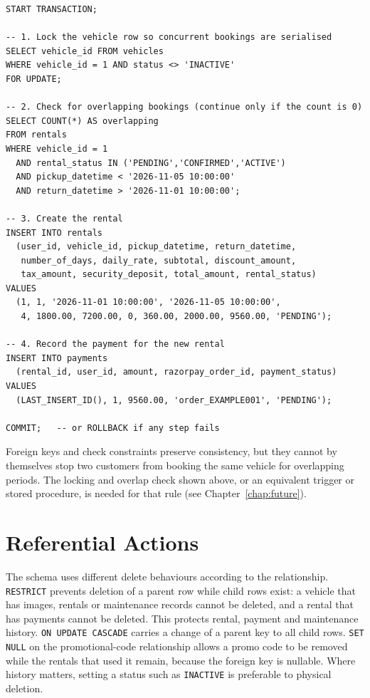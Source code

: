 \documentclass[10pt,a4paper]{report}
\newcommand{\col}[1]{\texttt{#1}}
\begin{document}
\begin{lstlisting}[caption={Booking transaction for a rental and its payment},label={lst:txn}]
START TRANSACTION;

-- 1. Lock the vehicle row so concurrent bookings are serialised
SELECT vehicle_id FROM vehicles
WHERE vehicle_id = 1 AND status <> 'INACTIVE'
FOR UPDATE;

-- 2. Check for overlapping bookings (continue only if the count is 0)
SELECT COUNT(*) AS overlapping
FROM rentals
WHERE vehicle_id = 1
  AND rental_status IN ('PENDING','CONFIRMED','ACTIVE')
  AND pickup_datetime < '2026-11-05 10:00:00'
  AND return_datetime > '2026-11-01 10:00:00';

-- 3. Create the rental
INSERT INTO rentals
  (user_id, vehicle_id, pickup_datetime, return_datetime,
   number_of_days, daily_rate, subtotal, discount_amount,
   tax_amount, security_deposit, total_amount, rental_status)
VALUES
  (1, 1, '2026-11-01 10:00:00', '2026-11-05 10:00:00',
   4, 1800.00, 7200.00, 0, 360.00, 2000.00, 9560.00, 'PENDING');

-- 4. Record the payment for the new rental
INSERT INTO payments
  (rental_id, user_id, amount, razorpay_order_id, payment_status)
VALUES
  (LAST_INSERT_ID(), 1, 9560.00, 'order_EXAMPLE001', 'PENDING');

COMMIT;   -- or ROLLBACK if any step fails
\end{lstlisting}

Foreign keys and check constraints preserve consistency, but they cannot by themselves stop two customers from booking the same vehicle for overlapping periods. The locking and overlap check shown above, or an equivalent trigger or stored procedure, is needed for that rule (see Chapter~\ref{chap:future}).

\section{Referential Actions}\label{sec:refactions}
The schema uses different delete behaviours according to the relationship. \col{RESTRICT} prevents deletion of a parent row while child rows exist: a vehicle that has images, rentals or maintenance records cannot be deleted, and a rental that has payments cannot be deleted. This protects rental, payment and maintenance history. \col{ON UPDATE CASCADE} carries a change of a parent key to all child rows. \col{SET NULL} on the promotional-code relationship allows a promo code to be removed while the rentals that used it remain, because the foreign key is nullable. Where history matters, setting a status such as \col{INACTIVE} is preferable to physical deletion.
\end{document}
